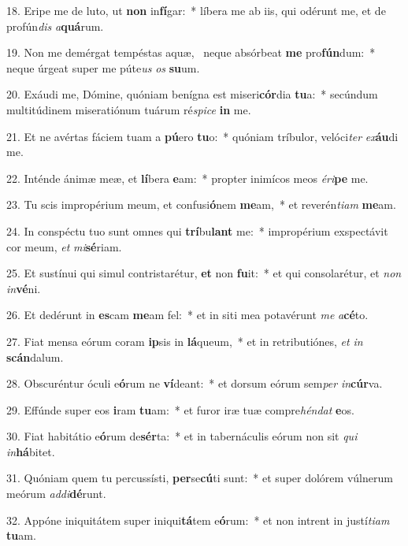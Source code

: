 18. Eripe me de luto, ut \textbf{non} in\textbf{fí}gar:~*  líbera me ab iis, qui odérunt me, et de profún\textit{dis} \textit{a}\textbf{quá}rum.\

19. Non me demérgat tempéstas aquæ, \dag\  neque absórbeat \textbf{me} pro\textbf{fún}dum:~*  neque úrgeat super me púte\textit{us} \textit{os} \textbf{su}um.\

20. Exáudi me, Dómine, quóniam benígna est miseri\textbf{cór}dia \textbf{tu}a:~*  secúndum multitúdinem miseratiónum tuárum ré\textit{spi}\textit{ce} \textbf{in} me.\

21. Et ne avértas fáciem tuam a \textbf{pú}ero \textbf{tu}o:~*  quóniam tríbulor, velóci\textit{ter} \textit{ex}\textbf{áu}di me.\

22. Inténde ánimæ meæ, et \textbf{lí}bera \textbf{e}am:~*  propter inimícos meos \textit{é}\textit{ri}\textbf{pe} me.\

23. Tu scis impropérium meum, et confusi\textbf{ó}nem \textbf{me}am,~*  et reverén\textit{ti}\textit{am} \textbf{me}am.\

24. In conspéctu tuo sunt omnes qui \textbf{trí}bu\textbf{lant} me:~*  impropérium exspectávit cor meum, \textit{et} \textit{mi}\textbf{sé}riam.\

25. Et sustínui qui simul contristarétur, \textbf{et} non \textbf{fu}it:~*  et qui consolarétur, et \textit{non} \textit{in}\textbf{vé}ni.\

26. Et dedérunt in \textbf{es}cam \textbf{me}am fel:~*  et in siti mea potavérunt \textit{me} \textit{a}\textbf{cé}to.\

27. Fiat mensa eórum coram \textbf{ip}sis in \textbf{lá}queum,~*  et in retributiónes, \textit{et} \textit{in} \textbf{scán}dalum.\

28. Obscuréntur óculi e\textbf{ó}rum ne \textbf{ví}deant:~*  et dorsum eórum sem\textit{per} \textit{in}\textbf{cúr}va.\

29. Effúnde super eos \textbf{i}ram \textbf{tu}am:~*  et furor iræ tuæ compre\textit{hén}\textit{dat} \textbf{e}os.\

30. Fiat habitátio e\textbf{ó}rum de\textbf{sér}ta:~*  et in tabernáculis eórum non sit \textit{qui} \textit{in}\textbf{há}bitet.\

31. Quóniam quem tu percussísti, \textbf{per}se\textbf{cú}ti sunt:~*  et super dolórem vúlnerum meórum \textit{ad}\textit{di}\textbf{dé}runt.\

32. Appóne iniquitátem super iniqui\textbf{tá}tem e\textbf{ó}rum:~*  et non intrent in justí\textit{ti}\textit{am} \textbf{tu}am.\

